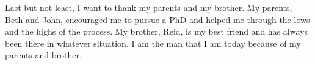 \begin{acknowledgements}
Last but not least, I want to thank my parents and my brother.
% 
My parents, Beth and John, encouraged me to pursue a PhD and helped me through the lows and the highs of the process.
% 
My brother, Reid, is my best friend and has always been there in whatever situation.
% 
I am the man that I am today because of my parents and brother.


\end{acknowledgements}